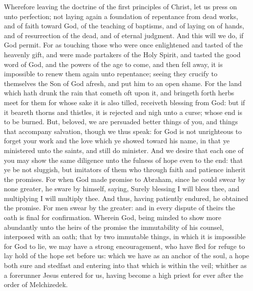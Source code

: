 Wherefore leaving the doctrine of the first principles of Christ, let us press on unto perfection; not laying again a foundation of repentance from dead works, and of faith toward God, of the teaching of baptisms, and of laying on of hands, and of resurrection of the dead, and of eternal judgment. And this will we do, if God permit. For as touching those who were once enlightened and tasted of the heavenly gift, and were made partakers of the Holy Spirit, and tasted the good word of God, and the powers of the age to come, and then fell away, it is impossible to renew them again unto repentance; seeing they crucify to themselves the Son of God afresh, and put him to an open shame. For the land which hath drunk the rain that cometh oft upon it, and bringeth forth herbs meet for them for whose sake it is also tilled, receiveth blessing from God: but if it beareth thorns and thistles, it is rejected and nigh unto a curse; whose end is to be burned.  But, beloved, we are persuaded better things of you, and things that accompany salvation, though we thus speak: for God is not unrighteous to forget your work and the love which ye showed toward his name, in that ye ministered unto the saints, and still do minister. And we desire that each one of you may show the same diligence unto the fulness of hope even to the end: that ye be not sluggish, but imitators of them who through faith and patience inherit the promises.  For when God made promise to Abraham, since he could swear by none greater, he sware by himself, saying, Surely blessing I will bless thee, and multiplying I will multiply thee. And thus, having patiently endured, he obtained the promise. For men swear by the greater: and in every dispute of theirs the oath is final for confirmation. Wherein God, being minded to show more abundantly unto the heirs of the promise the immutability of his counsel, interposed with an oath; that by two immutable things, in which it is impossible for God to lie, we may have a strong encouragement, who have fled for refuge to lay hold of the hope set before us: which we have as an anchor of the soul, a hope both sure and stedfast and entering into that which is within the veil; whither as a forerunner Jesus entered for us, having become a high priest for ever after the order of Melchizedek. 

